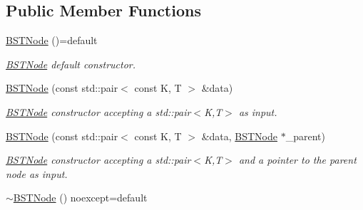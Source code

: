 \subsection*{Public Member Functions}
\begin{DoxyCompactItemize}
\item 
\mbox{\label{class_node_namespace_1_1_b_s_t_node_a783d05cdab47777a15e2b7b366db7d12}} 
\hyperlink{class_node_namespace_1_1_b_s_t_node_a783d05cdab47777a15e2b7b366db7d12}{B\+S\+T\+Node} ()=default
\begin{DoxyCompactList}\small\item\em \hyperlink{class_node_namespace_1_1_b_s_t_node}{B\+S\+T\+Node} default constructor. \end{DoxyCompactList}\item 
\mbox{\label{class_node_namespace_1_1_b_s_t_node_a867fb97b3ca84d805925b05f8daec0fa}} 
\hyperlink{class_node_namespace_1_1_b_s_t_node_a867fb97b3ca84d805925b05f8daec0fa}{B\+S\+T\+Node} (const std\+::pair$<$ const K, T $>$ \&data)
\begin{DoxyCompactList}\small\item\em \hyperlink{class_node_namespace_1_1_b_s_t_node}{B\+S\+T\+Node} constructor accepting a std\+::pair$<$\+K,\+T$>$ as input. \end{DoxyCompactList}\item 
\mbox{\label{class_node_namespace_1_1_b_s_t_node_a77cc8b32b8edb62c20c5352ee897fee2}} 
\hyperlink{class_node_namespace_1_1_b_s_t_node_a77cc8b32b8edb62c20c5352ee897fee2}{B\+S\+T\+Node} (const std\+::pair$<$ const K, T $>$ \&data, \hyperlink{class_node_namespace_1_1_b_s_t_node}{B\+S\+T\+Node} $\ast$\+\_\+parent)
\begin{DoxyCompactList}\small\item\em \hyperlink{class_node_namespace_1_1_b_s_t_node}{B\+S\+T\+Node} constructor accepting a std\+::pair$<$\+K,\+T$>$ and a pointer to the parent node as input. \end{DoxyCompactList}\item 
\mbox{\label{class_node_namespace_1_1_b_s_t_node_ad039a31573c8f56b0c156b3799f8db52}} 
\hyperlink{class_node_namespace_1_1_b_s_t_node_ad039a31573c8f56b0c156b3799f8db52}{$\sim$\+B\+S\+T\+Node} () noexcept=default

\end{DoxyCompactItemize}
